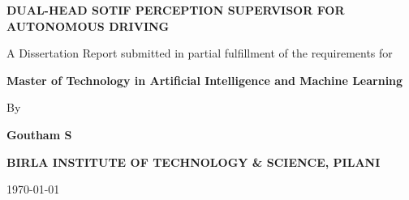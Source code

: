 \documentclass[12pt, a4paper, oneside]{report}
\newcommand{\myTitle}{Dual-Head SOTIF Perception Supervisor for Autonomous Driving}
\newcommand{\myName}{Goutham S}
\newcommand{\myDegree}{Master of Technology in Artificial Intelligence and Machine Learning}
\begin{document}

\begin{titlepage}
    \begin{center}
        \vspace*{1.5cm}
        {\LARGE \textbf{\MakeUppercase{\myTitle}}\par}
        \vspace{2cm}
        {\large A Dissertation Report submitted in partial fulfillment of the requirements for}\par
        \vspace{0.3cm}
        {\large \textbf{\myDegree}}\par
        \vspace{1.5cm}
        {\large By}\par
        \vspace{0.3cm}
        {\large \textbf{\myName}}\par
        \vfill
        {\large \textbf{BIRLA INSTITUTE OF TECHNOLOGY \& SCIENCE, PILANI}}\par
        {\large \today}\par
    \end{center}
\end{titlepage}

\tableofcontents
\listoffigures
\listoftables
\clearpage

\newpage
{}



% 

\clearpage
\nocite{*}


\end{document}
